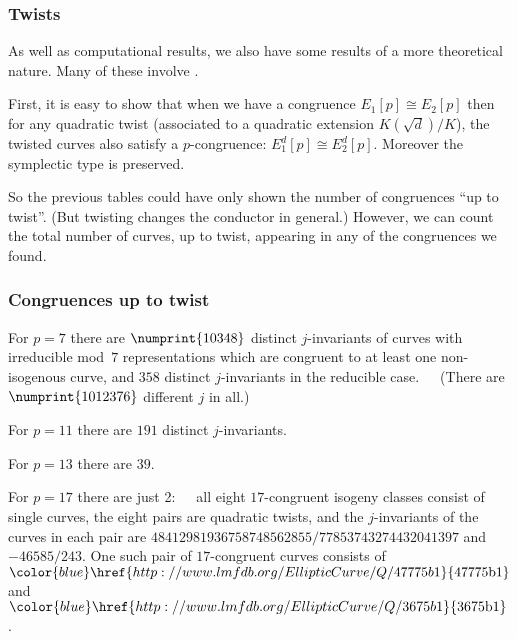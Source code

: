 \documentclass[handout]{beamer}
\newcommand{\lmfdbec}[3]{\color{blue}\href{http://www.lmfdb.org/EllipticCurve/Q/#1#2#3}{{\text{\rm#1#2#3}}}}
\newcommand{\high}[1]{\emph{\color{blue}{#1}}}
\begin{document}
\begin{frame}\frametitle{Twists}
As well as computational results, we also have some results of a
more theoretical nature.  Many of these involve \high{twists}.

\pause\medskip
First, it is easy to show that when we have a congruence $E_1[p]\cong
E_2[p]$ then for any quadratic twist (associated to a quadratic
extension $K(\sqrt{d})/K$), the twisted curves also satisfy a
$p$-congruence: $E_1^d[p]\cong E_2^d[p]$.  Moreover the symplectic
type is preserved.

\pause\medskip
So the previous tables could have only shown the number of congruences
``up to twist''.  (But twisting changes the conductor in general.)
However, we can count the total number of curves, up to twist,
appearing in any of the congruences we found.

\end{frame}

\begin{frame}\frametitle{Congruences up to twist}
For $p=7$ there are $\numprint{10348}$ distinct $j$-invariants of
curves with irreducible mod~$7$ representations which are congruent to
at least one non-isogenous curve, and $358$ distinct $j$-invariants in
the reducible case.\pause\ \ \   (There are $\numprint{1012376}$ different $j$ in
all.)

\pause\medskip
For $p=11$ there are $191$ distinct $j$-invariants.

For $p=13$ there are $39$.

For $p=17$ there are just 2:\ \ \ \pause all eight $17$-congruent isogeny
classes consist of single curves, the eight pairs are quadratic
twists, and the $j$-invariants of the curves in each pair are
$48412981936758748562855/77853743274432041397$ and $-46585/243$.  One
such pair of $17$-congruent curves consists of $\lmfdbec{47775}{b}{1}$
and~$\lmfdbec{3675}{b}{1}$.

\end{frame}
\end{document}
